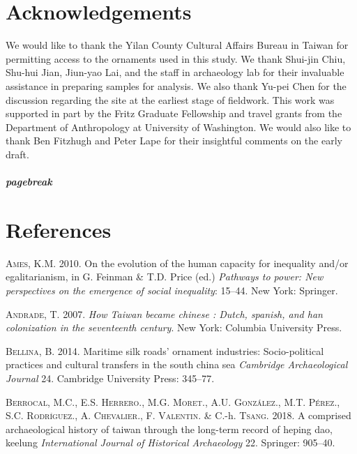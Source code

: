 \documentclass[]{article}
\let\oldsubparagraph\subparagraph
\renewcommand{\subparagraph}[1]{\oldsubparagraph{#1}\mbox{}}
\begin{document}
\hypertarget{acknowledgements}{%
\section{Acknowledgements}\label{acknowledgements}}

We would like to thank the Yilan County Cultural Affairs Bureau in
Taiwan for permitting access to the ornaments used in this study. We
thank Shui-jin Chiu, Shu-hui Jian, Jiun-yao Lai, and the staff in
archaeology lab for their invaluable assistance in preparing samples for
analysis. We also thank Yu-pei Chen for the discussion regarding the
site at the earliest stage of fieldwork. This work was supported in part
by the Fritz Graduate Fellowship and travel grants from the Department
of Anthropology at University of Washington. We would also like to thank
Ben Fitzhugh and Peter Lape for their insightful comments on the early
draft.

\hypertarget{pagebreak}{%
\subparagraph{pagebreak}\label{pagebreak}}

\hypertarget{references}{%
\section{References}\label{references}}

\hypertarget{refs}{}
\leavevmode\hypertarget{ref-Ames2010}{}%
\textsc{Ames}, K.M. 2010. On the evolution of the human capacity for
inequality and/or egalitarianism, in G. Feinman \& T.D. Price (ed.)
\emph{Pathways to power: New perspectives on the emergence of social
inequality}: 15--44. New York: Springer.

\leavevmode\hypertarget{ref-Andrade2007}{}%
\textsc{Andrade}, T. 2007. \emph{How Taiwan became chinese : Dutch,
spanish, and han colonization in the seventeenth century}. New York:
Columbia University Press.

\leavevmode\hypertarget{ref-Bellina2014}{}%
\textsc{Bellina}, B. 2014. Maritime silk roads' ornament industries:
Socio-political practices and cultural transfers in the south china sea
\emph{Cambridge Archaeological Journal} 24. Cambridge University Press:
345--77.

\leavevmode\hypertarget{ref-Berrocal2018}{}%
\textsc{Berrocal}, M.C., E.S. \textsc{Herrero}., M.G. \textsc{Moret}.,
A.U. \textsc{González}., M.T. \textsc{Pérez}., S.C. \textsc{Rodrı́guez}.,
A. \textsc{Chevalier}., F. \textsc{Valentin}. \& C.-h. \textsc{Tsang}.
2018. A comprised archaeological history of taiwan through the long-term
record of heping dao, keelung \emph{International Journal of Historical
Archaeology} 22. Springer: 905--40.
\end{document}
